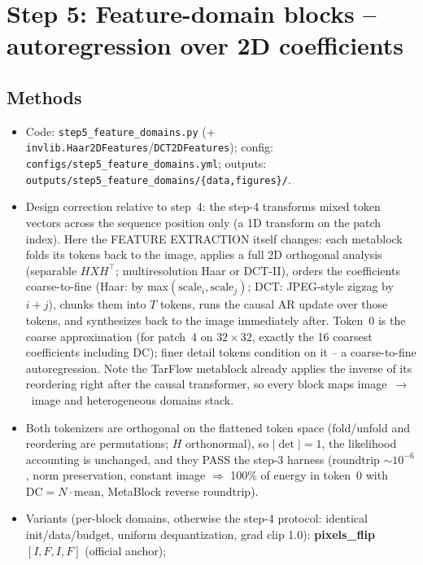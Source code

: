 \documentclass[11pt]{article}
\begin{document}
\section{Step 5: Feature-domain blocks -- autoregression over 2D
coefficients}

\subsection{Methods}
\begin{itemize}
  \item Code: \texttt{step5\_feature\_domains.py} (+
        \texttt{invlib.Haar2DFeatures}/\texttt{DCT2DFeatures}); config:
        \texttt{configs/step5\_feature\_domains.yml}; outputs:
        \texttt{outputs/step5\_feature\_domains/\{data,figures\}/}.
  \item Design correction relative to step~4: the step-4 transforms mixed
        token vectors across the sequence position only (a 1D transform on
        the patch index). Here the FEATURE EXTRACTION itself changes: each
        metablock folds its tokens back to the image, applies a full 2D
        orthogonal analysis (separable $HXH^\top$; multiresolution Haar or
        DCT-II), orders the coefficients coarse-to-fine (Haar: by
        max$(\mathrm{scale}_i,\mathrm{scale}_j)$; DCT: JPEG-style zigzag by
        $i{+}j$), chunks them into $T$ tokens, runs the causal AR update
        over those tokens, and synthesizes back to the image immediately
        after. Token~0 is the coarse approximation (for patch~4 on
        $32{\times}32$, exactly the 16 coarsest coefficients including DC);
        finer detail tokens condition on it -- a coarse-to-fine
        autoregression. Note the TarFlow metablock already applies the
        inverse of its reordering right after the causal transformer, so
        every block maps image~$\to$~image and heterogeneous domains stack.
  \item Both tokenizers are orthogonal on the flattened token space
        (fold/unfold and reordering are permutations; $H$ orthonormal), so
        $|\det|=1$, the likelihood accounting is unchanged, and they PASS
        the step-3 harness (roundtrip $\sim10^{-6}$, norm preservation,
        constant image $\Rightarrow$ 100\% of energy in token~0 with
        $\mathrm{DC}=N\cdot\mathrm{mean}$, MetaBlock reverse roundtrip).
  \item Variants (per-block domains, otherwise the step-4 protocol:
        identical init/data/budget, uniform dequantization, grad clip 1.0):
        \textbf{pixels\_flip} $[I,F,I,F]$ (official anchor);

\end{itemize}
\end{document}
